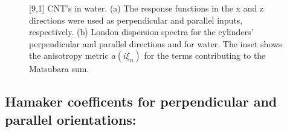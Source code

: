 \documentclass[onecolumn,letterpaper,amsmath,amssymb,floatfix,aps,superscriptaddress]{revtex4}
\begin{document}
\begin{figure}[t!]
\begin{center}
\begin{minipage}[b]{0.40\textwidth}
\begin{center}
\end{center}
\end{minipage}
\caption{[9,1] CNT's in water. (a) The response functions in the x and z
directions were used as perpendicular and parallel inputs, respectively. (b)
London dispersion spectra for the cylinders' perpendicular and parallel
directions and for water. The inset shows the anisotropy metric $a(i\xi_n)$ for
the terms contributing to the Matsubara sum.}
\label{eiz65}
\end{center}
\end{figure} 

\subsection{Hamaker coefficents for perpendicular and parallel orientations:}
\end{document}
